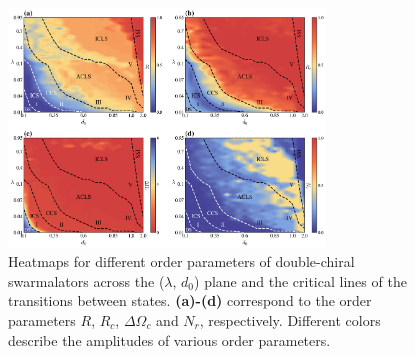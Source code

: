 \documentclass{article}
\begin{document}
\begin{figure}[H]
    \centering
    \includegraphics[width=0.75\textwidth]{./figs/orderParam.png}
    \caption{
        \label{fig:orderParam} Heatmaps for different order parameters of double-chiral swarmalators across the ($\lambda$, $d_0$) plane and the critical lines of the transitions between states.
        \textbf{(a)-(d)} correspond to the order parameters $R$, $R_c$, $\Delta \Omega_c$ and $N_r$, respectively.
        Different colors describe the amplitudes of various order parameters.
    }
\end{figure}


\end{document}
